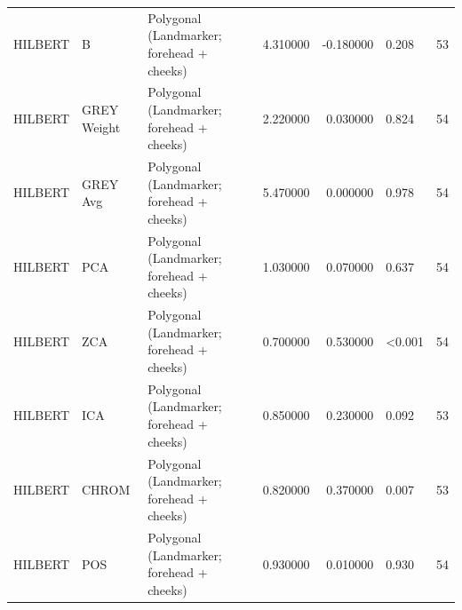 \begin{table}[htbp]
\begin{tabular}{l l l r r l r}
HILBERT & B & Polygonal (Landmarker; forehead + cheeks) & 4.310000 & -0.180000 & 0.208 & 53 \\
HILBERT & GREY Weight & Polygonal (Landmarker; forehead + cheeks) & 2.220000 & 0.030000 & 0.824 & 54 \\
HILBERT & GREY Avg & Polygonal (Landmarker; forehead + cheeks) & 5.470000 & 0.000000 & 0.978 & 54 \\
HILBERT & PCA & Polygonal (Landmarker; forehead + cheeks) & 1.030000 & 0.070000 & 0.637 & 54 \\
HILBERT & ZCA & Polygonal (Landmarker; forehead + cheeks) & 0.700000 & 0.530000 & <0.001 & 54 \\
HILBERT & ICA & Polygonal (Landmarker; forehead + cheeks) & 0.850000 & 0.230000 & 0.092 & 53 \\
HILBERT & CHROM & Polygonal (Landmarker; forehead + cheeks) & 0.820000 & 0.370000 & 0.007 & 53 \\
HILBERT & POS & Polygonal (Landmarker; forehead + cheeks) & 0.930000 & 0.010000 & 0.930 & 54 \\
\bottomrule
\end{tabular}

\end{table}
